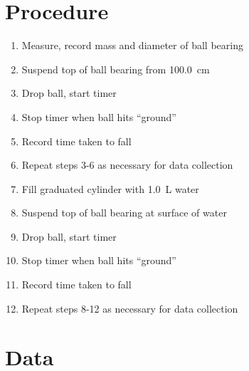 \documentclass[a4paper]{article}
\begin{document}
    \section{Procedure}
        \begin{enumerate}
            \item Measure, record mass and diameter of ball bearing
            \item Suspend top of ball bearing from \SI{100.0}{\cm}
            \item Drop ball, start timer
            \item Stop timer when ball hits ``ground''
            \item Record time taken to fall
            \item Repeat steps 3-6 as necessary for data collection
            \item Fill graduated cylinder with \SI{1.0}{\L} water
            \item Suspend top of ball bearing at surface of water
            \item Drop ball, start timer
            \item Stop timer when ball hits ``ground''
            \item Record time taken to fall
            \item Repeat steps 8-12 as necessary for data collection
        \end{enumerate}
    \section{Data}
\end{document}
